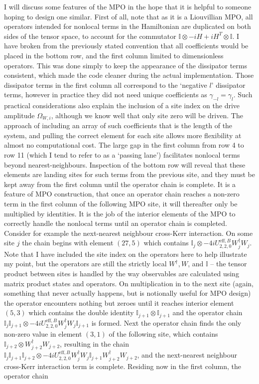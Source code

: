 I will discuss some features of the MPO in the hope that it is helpful to someone hoping to design one similar. First of all, note that as it is a Liouvillian MPO, all operators intended for nonlocal terms in the Hamiltonian are duplicated on both sides of the tensor space, to account for the commutator \(\mathbb{I} \otimes -iH + iH^{T} \otimes \mathbb{I}\). I have broken from the previously stated convention that all coefficients would be placed in the bottom row, and the first column limited to dimensionless operators. This was done simply to keep the appearance of the dissipator terms consistent, which made the code cleaner during the actual implementation. Those dissipator terms in the first column all correspond to the `negative \(l\)' dissipator terms, however in practice they did not need unique coefficients as \(\gamma_{-l} = \gamma_{l}\). Such practical considerations also explain the inclusion of a site index on the drive amplitude \(\Omega_{W,i}\), although we know well that only site zero will be driven. The approach of including an array of such coefficients that is the length of the system, and pulling the correct element for each site allows more flexibility at almost no computational cost. The large gap in the first column from row 4 to row 11 (which I tend to refer to as a `passing lane') facilitates nonlocal terms beyond nearest-neighbours. Inspection of the bottom row will reveal that these elements are landing sites for such terms from the previous site, and they must be kept away from the first column until the operator chain is complete. It is a feature of MPO construction, that once an operator chain reaches a non-zero term in the first column of the following MPO site, it will thereafter only be multiplied by identities. It is the job of the interior elements of the MPO to correctly handle the nonlocal terms until an operator chain is completed. Consider for example the next-nearest neighbour cross-Kerr interaction. On some site \(j\) the chain begins with element \((27,5)\) which contains \(\mathbb{I}_{j} \otimes -4iU^{\mathrm{eff},B}_{2,2,0}W_{j}^{\dagger}W_{j}\). Note that I have included the site index on the operators here to help illustrate my point, but the operators are still the strictly local \(W^{\dagger}, W\), and \(\mathbb{I}\) -- the tensor product between sites is handled by the way observables are calculated using matrix product states and operators. On multiplication in to the next site (again, something that never actually happens, but is notionally useful for MPO design) the operator encounters nothing but zeroes until it reaches interior element \((5,3)\) which contains the double identity \(\mathbb{I}_{j+1} \otimes \mathbb{I}_{j+1}\) and the operator chain \(\mathbb{I}_{j}\mathbb{I}_{j+1} \otimes -4iU^{\mathrm{eff},B}_{2,2,0}W_{j}^{\dagger}W_{j}\mathbb{I}_{j+1}\) is formed. Next the operator chain finds the only non-zero value in element \((3,1)\) of the following site, which contains \(\mathbb{I}_{j+2} \otimes W_{j+2}^{\dagger}W_{j+2}\), resulting in the chain \(\mathbb{I}_{j}\mathbb{I}_{j+1}\mathbb{I}_{j+2} \otimes -4iU^{\mathrm{eff},B}_{2,2,0}W_{j}^{\dagger}W_{j}\mathbb{I}_{j+1}W_{j+2}^{\dagger}W_{j+2}\), and the next-nearest neighbour cross-Kerr interaction term is complete. Residing now in the first column, the operator chain 